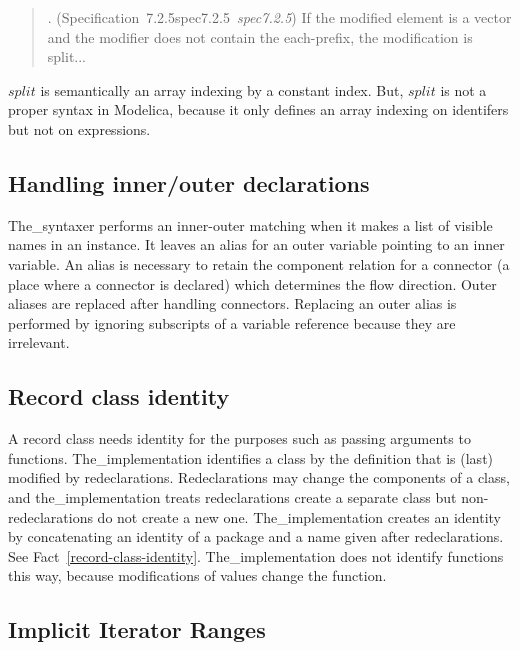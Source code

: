 \documentclass[10pt,b5paper]{article}
\newcounter{quoteno}
\def\quotelead{\refstepcounter{quoteno}{\bf{}Quote~\arabic{quoteno}}.}
\newenvironment{qquote}{\begin{quote}\quotelead}%
{\end{quote}\ignorespacesafterend}
\def\specrefx#1#2{Specification~#1\ifx\relax#2\relax{}\else~{\it{}#2}\fi}
\def\specref#1{\specrefx{#1}{\csname spec#1\endcsname}}
\begin{document}
\begin{qquote} (\specref{7.2.5}\/) If the modified element is a vector
and the modifier does not contain the each-prefix, the modification is
split...\end{qquote}

$\mathit{split}$ is semantically an array indexing by a constant
index.  But, $\mathit{split}$ is not a proper syntax in Modelica,
because it only defines an array indexing on identifers but not on
expressions.


\subsection{Handling inner/outer declarations}

The_syntaxer performs an inner-outer matching when it makes a list of
visible names in an instance.  It leaves an alias for an outer
variable pointing to an inner variable.  An alias is necessary to
retain the component relation for a connector (a place where a
connector is declared) which determines the flow direction.  Outer
aliases are replaced after handling connectors.  Replacing an outer
alias is performed by ignoring subscripts of a variable reference
because they are irrelevant.


\subsection{Record class identity}

A record class needs identity for the purposes such as passing
arguments to functions.  The_implementation identifies a class by the
definition that is (last) modified by redeclarations.  Redeclarations
may change the components of a class, and the_implementation treats
redeclarations create a separate class but non-redeclarations do not
create a new one.  The_implementation creates an identity by
concatenating an identity of a package and a name given after
redeclarations.  See Fact~\ref{record-class-identity}.
The_implementation does not identify functions this way, because
modifications of values change the function.


\subsection{Implicit Iterator Ranges}
\end{document}
